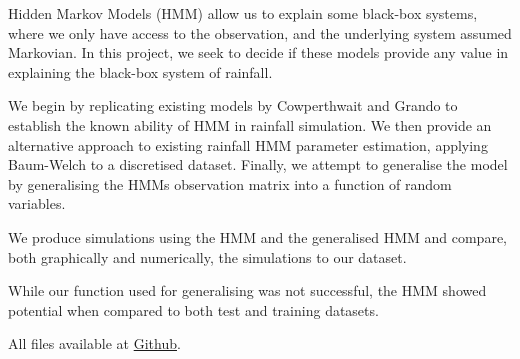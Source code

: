 Hidden Markov Models (HMM) allow us to explain some black-box systems, where we only have access to the observation, and the underlying system assumed Markovian. In this project, we seek to decide if these models provide any value in explaining the black-box system of rainfall.

We begin by replicating existing models by Cowperthwait and Grando to establish the known ability of HMM in rainfall simulation. We then provide an alternative approach to existing rainfall HMM parameter estimation, applying Baum-Welch to a discretised dataset. Finally, we attempt to generalise the model by generalising the HMMs observation matrix into a function of random variables.

We produce simulations using the HMM and the generalised HMM and compare, both graphically and numerically, the simulations to our dataset. 

While our function used for generalising was not successful, the HMM showed potential when compared to both test and training datasets.

All files available at \href{https://github.com/djagpal02/HiddenMarkovModels_RainGenerators }{Github}.